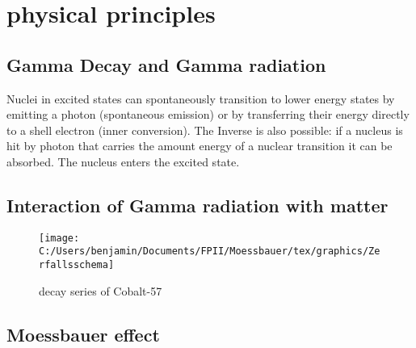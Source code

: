 
\section{physical principles}
\subsection{Gamma Decay and Gamma radiation}
Nuclei in excited states can spontaneously transition to lower energy states by emitting a photon (spontaneous emission) or by transferring their energy directly to a shell electron (inner conversion). The Inverse is also possible: if a nucleus is hit by photon that carries the amount energy of a nuclear transition it can be absorbed. The nucleus enters the excited state.

\subsection{Interaction of Gamma radiation with matter}
\begin{figure}[hb]
\centering
\texttt{[image: C:/Users/benjamin/Documents/FPII/Moessbauer/tex/graphics/Zerfallsschema]}
\caption[Co-57 decay]{decay series of Cobalt-57}
\label{fig:principles:Zerfallsschema}
\end{figure}
\subsection{Moessbauer effect}

